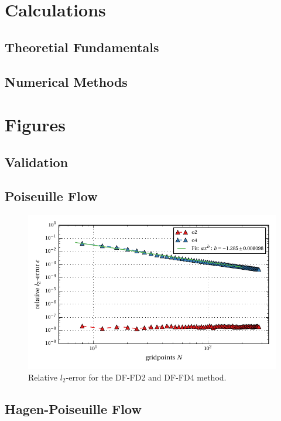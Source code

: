 \chapter{Calculations}

\section{Theoretial Fundamentals}
\section{Numerical Methods}

\chapter{Figures}
\section{Validation}
\section{Poiseuille Flow}


\begin{figure}[!bp]
    \centering
    \includegraphics{gfx/immersed_boundary/poiseuille_flow/3_df/relative_l2error.pdf}
    \caption{Relative $l_2$-error for the DF-FD2 and DF-FD4 method.}
    \label{fig:vali_pflow_3gc}
\end{figure}

\section{Hagen-Poiseuille Flow}


